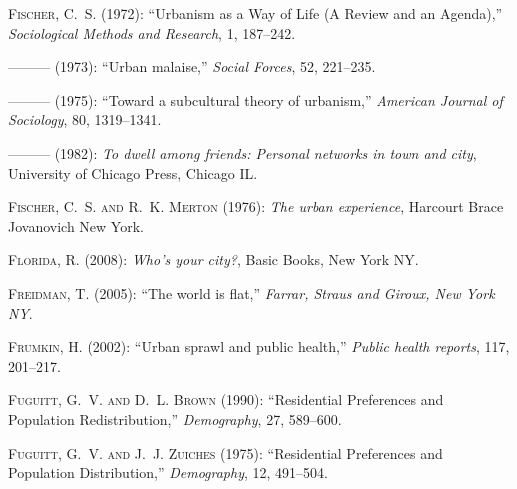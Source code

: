\documentclass[12pt, letterpaper]{article}
\begin{document}
\begin{spacing}{1.9}
\begin{thebibliography}{77}
\textsc{Fischer, C.~S.} (1972): \enquote{Urbanism as a Way of Life (A Review
  and an Agenda),} \emph{Sociological Methods and Research}, 1, 187--242.

---\hspace{-.1pt}---\hspace{-.1pt}--- (1973): \enquote{Urban malaise,}
  \emph{Social Forces}, 52, 221--235.

---\hspace{-.1pt}---\hspace{-.1pt}--- (1975): \enquote{Toward a subcultural
  theory of urbanism,} \emph{American Journal of Sociology}, 80, 1319--1341.

---\hspace{-.1pt}---\hspace{-.1pt}--- (1982): \emph{To dwell among friends:
  Personal networks in town and city}, University of Chicago Press, Chicago IL.

\textsc{Fischer, C.~S. and R.~K. Merton} (1976): \emph{The urban experience},
  Harcourt Brace Jovanovich New York.

\textsc{Florida, R.} (2008): \emph{Who's your city?}, Basic Books, New York NY.

\textsc{Freidman, T.} (2005): \enquote{The world is flat,} \emph{Farrar, Straus
  and Giroux, New York NY}.

\textsc{Frumkin, H.} (2002): \enquote{Urban sprawl and public health,}
  \emph{Public health reports}, 117, 201--217.

\textsc{Fuguitt, G.~V. and D.~L. Brown} (1990): \enquote{Residential
  Preferences and Population Redistribution,} \emph{Demography}, 27, 589--600.

\textsc{Fuguitt, G.~V. and J.~J. Zuiches} (1975): \enquote{Residential
  Preferences and Population Distribution,} \emph{Demography}, 12, 491--504.


\end{thebibliography}
\end{spacing}
\end{document}
